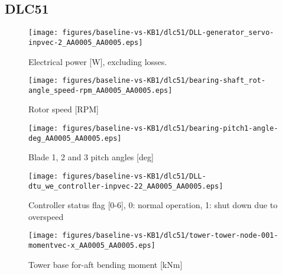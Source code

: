 
\subsection{DLC51}
\label{sec:baseline-vs-KB1:dlc51}

\begin{figure}[!ht]
\begin{center}
	\texttt{[image: figures/baseline-vs-KB1/dlc51/DLL-generator\_servo-inpvec-2\_AA0005\_AA0005.eps]}
\end{center}
\caption{Electrical power [W], excluding losses.}
\label{fig:baseline-vs-KB1:dlc51:power}
\end{figure}

\begin{figure}[!ht]
\begin{center}
	\texttt{[image: figures/baseline-vs-KB1/dlc51/bearing-shaft\_rot-angle\_speed-rpm\_AA0005\_AA0005.eps]}
\end{center}
\caption{Rotor speed [RPM]}
\label{fig:baseline-vs-KB1:dlc51:rpm}
\end{figure}

\begin{figure}[!ht]
\begin{center}
	\texttt{[image: figures/baseline-vs-KB1/dlc51/bearing-pitch1-angle-deg\_AA0005\_AA0005.eps]}
\end{center}
\caption{Blade 1, 2 and 3 pitch angles [deg]}
\label{fig:baseline-vs-KB1:dlc51:pitch}
\end{figure}

\begin{figure}[!ht]
\begin{center}
	\texttt{[image: figures/baseline-vs-KB1/dlc51/DLL-dtu\_we\_controller-inpvec-22\_AA0005\_AA0005.eps]}
\end{center}
\caption{Controller status flag [0-6], 0: normal operation, 1: shut down due to overspeed}
\label{fig:baseline-vs-KB1:dlc51:status}
\end{figure}

\begin{figure}[!ht]
\begin{center}
	\texttt{[image: figures/baseline-vs-KB1/dlc51/tower-tower-node-001-momentvec-x\_AA0005\_AA0005.eps]}
\end{center}
\caption{Tower base for-aft bending moment [kNm]}
\label{fig:baseline-vs-KB1:dlc51:tower-base-fa}
\end{figure}

